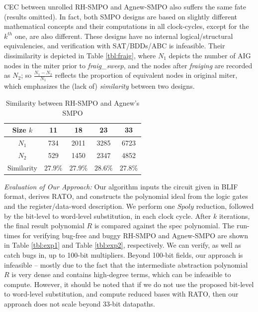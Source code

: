 CEC between unrolled RH-SMPO and Agnew-SMPO also suffers the same fate
(results omitted). In fact, both SMPO designs are based on slightly
different mathematical concepts and their computations in all
clock-cycles, except for the $k^{th}$ one, are also different. These
designs have no internal logical/structural equivalencies, and
verification with SAT/BDDs/ABC is infeasible. Their dissimilarity is
depicted in Table \ref{tbl:fraig}, where  $N_1$ depicts the number of
AIG nodes in the miter prior to {\it fraig\_sweep}, and the nodes
after {\it fraiging} are recorded as $N_2$; so $\frac{N_1-N_2}{N_1}$
reflects the proportion of equivalent nodes in original miter, which
emphasizes the (lack of) \emph{similarity} between two designs.  

\begin{table}[htb]
\centering
\caption{\small Similarity between RH-SMPO and Agnew's SMPO}
\label{tbl:fraig}
\begin{tabular}{|c||c|c|c|c|} 
\hline
Size $k$ & 11 & 18 & 23 & 33 \\
\hline
$N_1$ & 734  & 2011  & 3285  & 6723\\
\hline
$N_2$ & 529 & 1450 & 2347 & 4852\\
\hline
Similarity & $27.9\%$ & $27.9\%$ & $28.6\%$ & $27.8\%$  \\
\hline
\end{tabular}\label{table:similarity}  
\end{table} 

{\it Evaluation of Our Approach:} Our algorithm inputs the circuit
given in BLIF format, derives RATO, and constructs the polynomial
ideal from the logic gates and the register/data-word description.  We
perform one $Spoly$ reduction, followed by the bit-level to word-level 
substitution, in each clock cycle. After $k$ iterations, the final
result polynomial $R$ is compared against the spec polynomial. The
run-times for verifying bug-free and buggy RH-SMPO and Agnew-SMPO are
shown in Table \ref{tbl:exp1} and Table \ref{tbl:exp2}, respectively. 
We can verify, as well as catch bugs in, up to 100-bit
multipliers. Beyond 100-bit fields, our approach is infeasible --
mostly due to the fact that the intermediate 
abstraction polynomial $R$ is very dense and contains high-degree
terms, which can be infeasible to compute. However, it should be noted
that if we do not use the proposed bit-level to word-level
substitution, and compute reduced \Grobner bases with RATO, then our
approach does not scale beyond 33-bit datapaths. 

